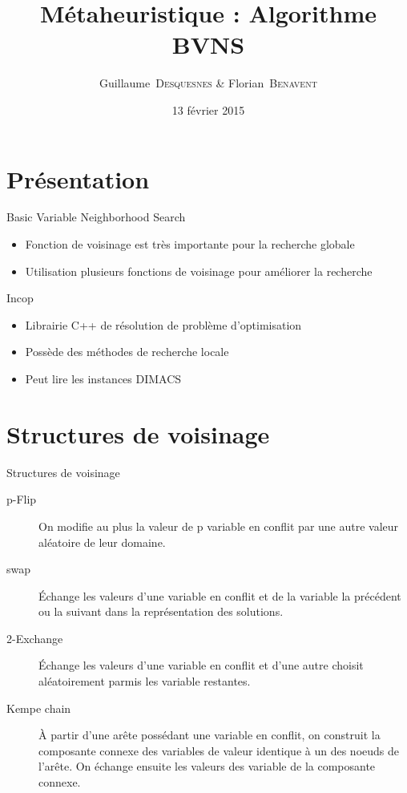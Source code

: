 \documentclass{beamer}
\title[Métaheuristique : Algorithme BVNS]
{%
	Métaheuristique : Algorithme BVNS
}
\author{Guillaume~\textsc{Desquesnes} \& Florian~\textsc{Benavent}}
\date{13 février 2015}
\begin{document}
	\frame{\titlepage}

	\section{Présentation}

		\begin{frame}{Basic Variable Neighborhood Search}
			\begin{itemize}
				\item Fonction de voisinage est très importante pour la recherche globale
				\item Utilisation plusieurs fonctions de voisinage pour améliorer la recherche
			\end{itemize}
		\end{frame}
		
		
		\begin{frame}{Incop}
			\begin{itemize}
				\item Librairie C++ de résolution de problème d'optimisation
				\item Possède des méthodes de recherche locale
				\item Peut lire les instances DIMACS
			\end{itemize}
		\end{frame}
	
	\section{Structures de voisinage}
		\begin{frame}{Structures de voisinage}
			\begin{description}
				\item[p-Flip]On modifie au plus la valeur de p variable en conflit par une autre valeur aléatoire de leur domaine.

				\item[swap]\'Echange les valeurs d'une variable en conflit et de la variable la précédent ou la suivant dans la représentation des solutions.

				\item[2-Exchange]\'Echange les valeurs d'une variable en conflit et d'une autre choisit aléatoirement parmis les variable restantes.

				\item[Kempe chain]À partir d'une arête possédant une variable en conflit, on construit la composante connexe des variables de valeur identique à un des
				noeuds de l'arête. On échange ensuite les valeurs des variable de la composante connexe.
			\end{description}
		\end{frame}
	
\end{document}
